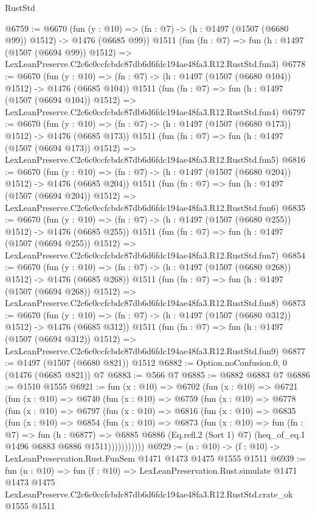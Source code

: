\begin{lexlean}{RustStd}
\begin{coremodule}
@6759 := @6670
    (fun (y : @10) => (fn : @7) -> (h : @1497 (@1507 (@6680 @99)) @1512) -> @1476 (@6685 @99))
    @1511
    (fun (fn : @7) =>
    fun (h : @1497 (@1507 (@6694 @99)) @1512) =>
    LexLeanPreserve.C2c6c0ccfcbdc87db6d6fdc194ae48fa3.R12.RustStd.fun3)
@6778 := @6670
    (fun (y : @10) => (fn : @7) -> (h : @1497 (@1507 (@6680 @104)) @1512) -> @1476 (@6685 @104))
    @1511
    (fun (fn : @7) =>
    fun (h : @1497 (@1507 (@6694 @104)) @1512) =>
    LexLeanPreserve.C2c6c0ccfcbdc87db6d6fdc194ae48fa3.R12.RustStd.fun4)
@6797 := @6670
    (fun (y : @10) => (fn : @7) -> (h : @1497 (@1507 (@6680 @173)) @1512) -> @1476 (@6685 @173))
    @1511
    (fun (fn : @7) =>
    fun (h : @1497 (@1507 (@6694 @173)) @1512) =>
    LexLeanPreserve.C2c6c0ccfcbdc87db6d6fdc194ae48fa3.R12.RustStd.fun5)
@6816 := @6670
    (fun (y : @10) => (fn : @7) -> (h : @1497 (@1507 (@6680 @204)) @1512) -> @1476 (@6685 @204))
    @1511
    (fun (fn : @7) =>
    fun (h : @1497 (@1507 (@6694 @204)) @1512) =>
    LexLeanPreserve.C2c6c0ccfcbdc87db6d6fdc194ae48fa3.R12.RustStd.fun6)
@6835 := @6670
    (fun (y : @10) => (fn : @7) -> (h : @1497 (@1507 (@6680 @255)) @1512) -> @1476 (@6685 @255))
    @1511
    (fun (fn : @7) =>
    fun (h : @1497 (@1507 (@6694 @255)) @1512) =>
    LexLeanPreserve.C2c6c0ccfcbdc87db6d6fdc194ae48fa3.R12.RustStd.fun7)
@6854 := @6670
    (fun (y : @10) => (fn : @7) -> (h : @1497 (@1507 (@6680 @268)) @1512) -> @1476 (@6685 @268))
    @1511
    (fun (fn : @7) =>
    fun (h : @1497 (@1507 (@6694 @268)) @1512) =>
    LexLeanPreserve.C2c6c0ccfcbdc87db6d6fdc194ae48fa3.R12.RustStd.fun8)
@6873 := @6670
    (fun (y : @10) => (fn : @7) -> (h : @1497 (@1507 (@6680 @312)) @1512) -> @1476 (@6685 @312))
    @1511
    (fun (fn : @7) =>
    fun (h : @1497 (@1507 (@6694 @312)) @1512) =>
    LexLeanPreserve.C2c6c0ccfcbdc87db6d6fdc194ae48fa3.R12.RustStd.fun9)
@6877 := @1497 (@1507 (@6680 @821)) @1512
@6882 := Option.noConfusion.{0, 0} (@1476 (@6685 @821)) @7
@6883 := @566 @7
@6885 := @6882 @6883 @7
@6886 := @1510 @1555
@6921 := fun (x : @10) =>
  @6702
    (fun (x : @10) =>
    @6721
      (fun (x : @10) =>
      @6740
        (fun (x : @10) =>
        @6759
          (fun (x : @10) =>
          @6778
            (fun (x : @10) =>
            @6797
              (fun (x : @10) =>
              @6816
                (fun (x : @10) =>
                @6835
                  (fun (x : @10) =>
                  @6854
                    (fun (x : @10) =>
                    @6873
                      (fun (x : @10) =>
                      fun (fn : @7) =>
                      fun (h : @6877) =>
                      @6885
                        @6886
                        (Eq.refl.{2} (Sort 1) @7)
                        (heq_of_eq.{1} @1496 @6883 @6886 @1511)))))))))))
@6929 := (n : @10) -> (f : @10) -> LexLeanPreservation.Rust.FunSem @1471 @1473 @1475 @1555 @1511
@6939 := fun (n : @10) =>
  fun (f : @10) =>
  LexLeanPreservation.Rust.simulate
    @1471
    @1473
    @1475
    LexLeanPreserve.C2c6c0ccfcbdc87db6d6fdc194ae48fa3.R12.RustStd.crate_ok
    @1555
    @1511
\end{coremodule}
\end{lexlean}
